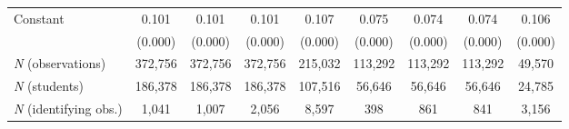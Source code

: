 {\begin{tabular*}{\hsize}{@{\hskip\tabcolsep\extracolsep\fill}l*{8}{c}}
\addlinespace
Constant            &       0.101\sym{***}&       0.101\sym{***}&       0.101\sym{***}&       0.107\sym{***}&       0.075\sym{***}&       0.074\sym{***}&       0.074\sym{***}&       0.106\sym{***}\\
                    &     (0.000)         &     (0.000)         &     (0.000)         &     (0.000)         &     (0.000)         &     (0.000)         &     (0.000)         &     (0.000)         \\
\midrule
 \textit{N} (observations)&     372,756         &     372,756         &     372,756         &     215,032         &     113,292         &     113,292         &     113,292         &      49,570         \\
 \textit{N} (students)&     186,378         &     186,378         &     186,378         &     107,516         &      56,646         &      56,646         &      56,646         &      24,785         \\
\textit{N} (identifying obs.)&       1,041         &       1,007         &       2,056         &       8,597         &         398         &         861         &         841         &       3,156         \\
\bottomrule
\end{tabular*}
}
